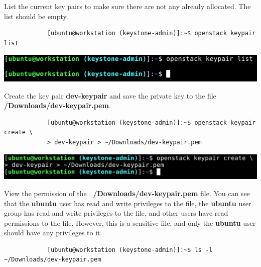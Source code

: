 \documentclass[letterpaper, 12pt]{article}
\begin{document}
\begin{enumerate}
    \begin{labstep}
        List the current key pairs to make sure there are not any already allocated.
        The list should be empty.
        \begin{lstlisting}
            [ubuntu@workstation (keystone-admin)]:~$ openstack keypair list
        \end{lstlisting}

        \begin{center}
            \includegraphics[width=\linewidth]{images/part1/step21.png}
        \end{center}
    \end{labstep}

    \begin{labstep}
        Create the key pair \textbf{dev-keypair} and save the private key to the file
        \textbf{\texttildemid/Downloads/dev-keypair.pem}.
        \begin{lstlisting}
            [ubuntu@workstation (keystone-admin)]:~$ openstack keypair create \
            > dev-keypair > ~/Downloads/dev-keypair.pem
        \end{lstlisting}

        \begin{center}
            \includegraphics[width=\linewidth]{images/part1/step22.png}
        \end{center}
    \end{labstep}

    \begin{labstep}
        View the permission of the \textbf{~/Downloads/dev-keypair.pem} file.
        You can see that the \textbf{ubuntu} user has read and write privileges to the file, the \textbf{ubuntu} user group has read and write privileges to the file, and other users have read permissions to the file.
        However, this is a sensitive file, and only the \textbf{ubuntu} user should have any privileges to it.
        \begin{lstlisting}
            [ubuntu@workstation (keystone-admin)]:~$ ls -l ~/Downloads/dev-keypair.pem
        \end{lstlisting}


\end{labstep}
\end{enumerate}
\end{document}
